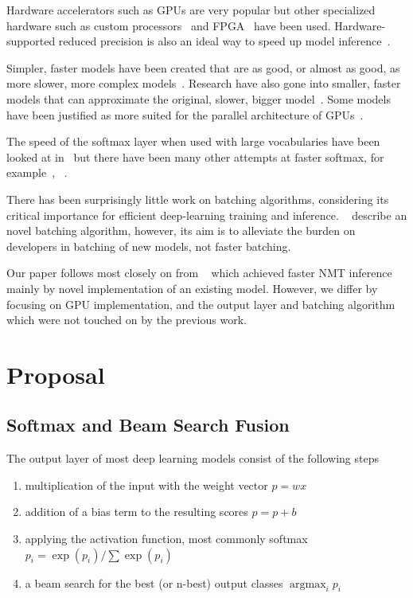 \documentclass[11pt,a4paper]{article}
\DeclareMathOperator*{\argmax}{argmax}
\begin{document}
Hardware accelerators such as GPUs are very popular but other specialized hardware such as custom processors~\citep{DBLP:journals/corr/JouppiYPPABBBBB17} and FPGA~\citep{DBLP:journals/corr/LaceyTA16} have been used. Hardware-supported reduced precision is also an ideal way to speed up model inference~\citep{DBLP:journals/corr/abs-1710-03740}.

Simpler, faster models have been created that are as good, or almost as good, as more slower, more complex models~\citep{DBLP:journals/corr/BahdanauCB14}. Research have also gone into smaller, faster models that can approximate the original, slower, bigger model~\citep{DBLP:conf/emnlp/KimR16}. Some models have been justified as more suited for the parallel architecture of GPUs~\cite{DBLP:journals/corr/VaswaniSPUJGKP17}.

The speed of the softmax layer when used with large vocabularies have been looked at in~\citep{DBLP:journals/corr/GraveJCGJ16} but there have been many other attempts at faster softmax, for example~\cite{DBLP:journals/corr/abs-1301-3781}, ~\cite{Zoph-2016}.

There has been surprisingly little work on batching algorithms, considering its critical importance for efficient deep-learning training and inference. ~\cite{Neubig-autobatching} describe an novel batching algorithm, however, its aim is to alleviate the burden on developers in batching of new models, not faster batching.

Our paper follows most closely on from ~\cite{DBLP:conf/emnlp/Devlin17} which achieved faster NMT inference mainly by novel implementation of an existing model. However, we differ by focusing on GPU implementation, and the output layer and batching algorithm which were not touched on by the previous work.

\section{Proposal}
\label{sec:Proposal}

\subsection{Softmax and Beam Search Fusion}

The output layer of most deep learning models consist of the following steps
\begin{enumerate}
   \item \vspace{-2 mm} multiplication of the input with the weight vector $p = w x$
   \item \vspace{-2 mm} addition of a bias term to the resulting scores $p = p + b$
   \item \vspace{-2 mm} applying the activation function, most commonly softmax $ p_i = \exp(p_i) / \sum \exp(p_i) $
   \item \vspace{-2 mm} a beam search for the best (or n-best) output classes $\argmax_i p_i$
\end{enumerate}
\end{document}
